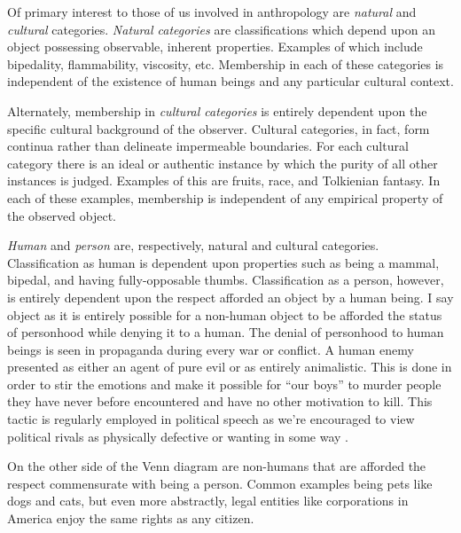 \documentclass[12pt]{article}
\begin{document}
Of primary interest to those of us involved in anthropology are \emph{natural}
and \emph{cultural} categories. \emph{Natural categories} are classifications
which depend upon an object possessing observable, inherent properties. Examples
of which include bipedality, flammability, viscosity, etc. Membership in each of
these categories is independent of the existence of human beings and any
particular cultural context.

Alternately, membership in \emph{cultural categories} is entirely dependent upon
the specific cultural background of the observer. Cultural categories, in fact,
form continua rather than delineate impermeable boundaries. For each cultural
category there is an ideal or authentic instance by which the purity of all
other instances is judged. Examples of this are fruits, race, and Tolkienian
fantasy. In each of these examples, membership is independent of any empirical
property of the observed object.

\emph{Human} and \emph{person} are, respectively, natural and cultural
categories. Classification as human is dependent upon properties such as being a
mammal, bipedal, and having fully-opposable thumbs. Classification as a person,
however, is entirely dependent upon the respect afforded an object by a human
being. I say object as it is entirely possible for a non-human object to be
afforded the status of personhood while denying it to a human. The denial of
personhood to human beings is seen in propaganda during every war or conflict. A
human enemy presented as either an agent of pure evil or as entirely
animalistic. This is done in order to stir the emotions and make it possible for
``our boys'' to murder people they have never before encountered and have no
other motivation to kill. This tactic is regularly employed in political speech
as we're encouraged to view political rivals as physically defective or wanting
in some way .

On the other side of the Venn diagram are non-humans that are afforded the
respect commensurate with being a person. Common examples being pets like dogs
and cats, but even more abstractly, legal entities like corporations in
America enjoy the same rights as any citizen.

\newpage{}
\printbibliography
\end{document}
